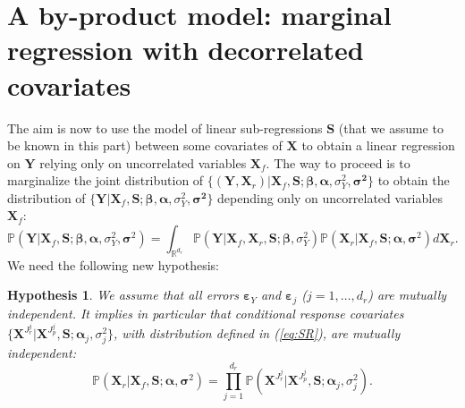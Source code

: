 \documentclass[12pt,a4paper]{report}
\newtheorem{hyp}{Hypothesis}
\begin{document}
\section{A by-product model: marginal regression with decorrelated covariates}\label{sectionmarginal}
The aim is now to use the model of linear sub-regressions $\boldsymbol{S}$ (that we assume to be known in this part) between some covariates of $\boldsymbol{X}$ to obtain a linear regression on $\boldsymbol{Y}$ relying only on uncorrelated variables $\boldsymbol{X}_f$.  The way to proceed is to marginalize the joint distribution of $\{(\boldsymbol{Y},\boldsymbol{X}_r) |\boldsymbol{X}_f,\boldsymbol{S};\boldsymbol{\beta},\boldsymbol{\alpha},\sigma_Y^2,\boldsymbol{\sigma^2}\}$ to obtain the distribution of $\{\boldsymbol{Y} |\boldsymbol{X}_f,\boldsymbol{S};\boldsymbol{\beta},\boldsymbol{\alpha},\sigma_Y^2,\boldsymbol{\sigma^2}\}$ depending only on uncorrelated variables $\boldsymbol{X}_f$:
\begin{equation}\label{eq:marginal}
\mathbb{P}(\boldsymbol{Y} |\boldsymbol{X}_f,\boldsymbol{S};\boldsymbol{\beta},\boldsymbol{\alpha},\sigma_Y^2,\boldsymbol{\sigma}^2) = \int_{{\mathbb{R}^{d_r}}}\mathbb{P}(\boldsymbol{Y}| \boldsymbol{X}_f,\boldsymbol{X}_r,\boldsymbol{S};\boldsymbol{\beta},\sigma_Y^2) \mathbb{P}(\boldsymbol{X}_r | \boldsymbol{X}_f,\boldsymbol{S};\boldsymbol{\alpha},\boldsymbol{\sigma}^2) d\boldsymbol{X}_r.
\end{equation}
We need the following new hypothesis:

\begin{hyp}\label{H3}
We assume that all errors $\boldsymbol{\varepsilon}_Y$ and $\boldsymbol{\varepsilon}_j$ ($j=1,\ldots,d_r$) are {\it mutually independent}. It implies in particular that conditional response covariates $\{\boldsymbol{X}^{J_{r}^j}|\boldsymbol{X}^{J_{p}^j},\boldsymbol{S};\boldsymbol{\alpha}_j,\sigma^2_j\}$, with distribution defined in (\ref{eq:SR}), are {\it mutually independent}:
\begin{equation}\label{eq:H3}
\mathbb{P}(\boldsymbol{X}_r | \boldsymbol{X}_f,\boldsymbol{S};\boldsymbol{\alpha},\boldsymbol{\sigma}^2) = \prod_{j=1}^{d_r} \mathbb{P}(\boldsymbol{X}^{J_{r}^j}|\boldsymbol{X}^{J_{p}^j},\boldsymbol{S};\boldsymbol{\alpha}_j,\sigma^2_j). 
\end{equation}
\end{hyp}

\vspace{3mm}
\end{document}
